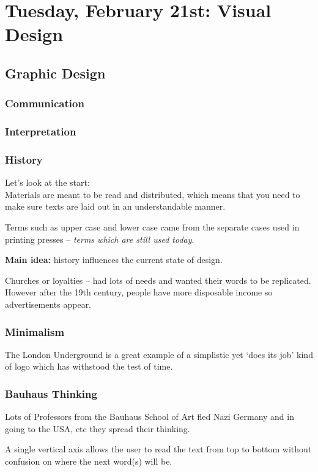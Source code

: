 \section{Tuesday, February 21st: Visual Design}
\subsection{Graphic Design}
\subsubsection{Communication}
\subsubsection{Interpretation}
\subsubsection{History}
Let's look at the start:\\
Materials are meant to be read and distributed, which means that you need to make sure texts are laid out in an understandable manner.

Terms such as upper case and lower case came from the separate cases used in printing presses -- \textit{terms which are still used today}.

\textbf{Main idea:} history influences the current state of design.

Churches or loyalties -- had lots of needs and wanted their words to be replicated. However after the 19th century, people have more disposable income so advertisements appear.

\subsubsection{Minimalism}
The London Underground is a great example of a simplistic yet `does its job' kind of logo which has withstood the test of time.

\subsubsection{Bauhaus Thinking}
Lots of Professors from the Bauhaus School of Art fled Nazi Germany and in going to the USA, etc they spread their thinking.

A single vertical axis allows the user to read the text from top to bottom without confusion on where the next word(s) will be.

